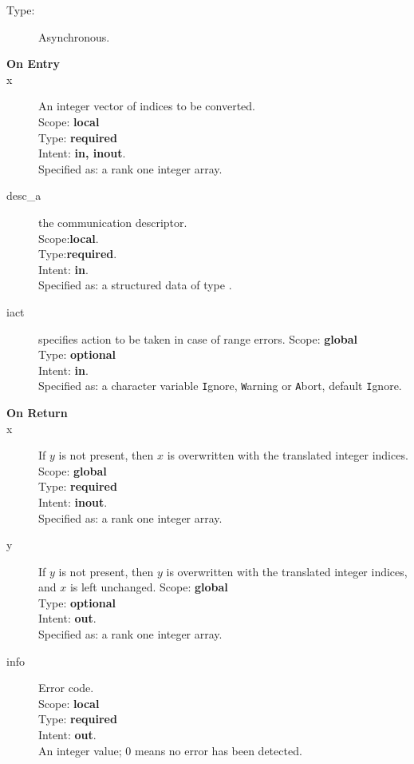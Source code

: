 \begin{description}
\item[Type:] Asynchronous.
\item[\bf On Entry]
\item[x] An integer vector of indices to be converted.\\
Scope: {\bf local} \\
Type: {\bf required}\\
Intent: {\bf in, inout}.\\
Specified as: a rank one integer array.\\
\item[desc\_a] the communication descriptor.\\
Scope:{\bf local}.\\
Type:{\bf required}.\\
Intent: {\bf in}.\\
Specified as: a structured data of type \descdata.
\item[iact] specifies action to be taken in case of range errors. 
Scope: {\bf global} \\
Type: {\bf optional}\\
Intent: {\bf in}.\\
Specified as: a character variable  \verb|I|gnore, \verb|W|arning or
\verb|A|bort, default \verb|I|gnore.
\end{description}

\begin{description}
\item[\bf On Return]
\item[x] If $y$ is not present,
  then $x$ is overwritten with the translated integer indices. 
Scope: {\bf global} \\
Type: {\bf required}\\
Intent: {\bf inout}.\\
Specified as: a rank one integer array.
\item[y] If $y$ is not present,
  then $y$ is overwritten with the translated integer indices, and $x$
  is left unchanged. 
Scope: {\bf global} \\
Type: {\bf optional}\\
Intent: {\bf out}.\\
Specified as: a rank one integer array.
\item[info] Error code.\\
Scope: {\bf local} \\
Type: {\bf required} \\
Intent: {\bf out}.\\
An integer value; 0 means no error has been detected. 
\end{description}



